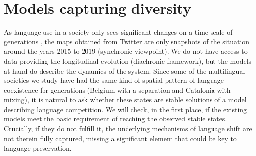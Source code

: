 \documentclass[../thesis.tex]{subfiles}
\begin{document}
\section{Models capturing diversity} 
As language use in a society only sees significant changes on a time scale of
generations \cite{LabovSociolinguisticPatterns1973}, the maps obtained from Twitter are
only snapshots of the situation around the years 2015 to 2019 (synchronic viewpoint). We
do not have access to data providing the longitudinal evolution (diachronic framework),
but the models at hand do describe the dynamics of the system. Since some of the
multilingual societies we study have had the same kind of spatial pattern of language
coexistence for generations (Belgium with a separation and Catalonia with mixing), it is
natural to ask whether these states are stable solutions of a model describing language
competition. We will check, in the first place, if the existing models meet the basic
requirement of reaching the observed stable states. Crucially, if they do not fulfill
it, the underlying mechanisms of language shift are not therein fully captured, missing
a significant element that could be key to language preservation.
\end{document}
